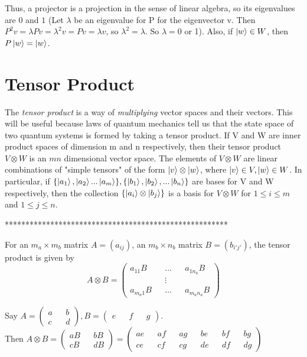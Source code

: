 {Thus, a projector is a projection in the sense of linear algebra, so its eigenvalues are $0$ and $1$ (Let $\lambda$ be an eigenvalue for P for the eigenvector v. Then $P^2 v = \lambda Pv=\lambda^2 v = Pv =\lambda v$, so $\lambda^2=\lambda$. So $\lambda=0$ or 1).  Also, if $\ket{w} \in W$, then $P\ket{w}=\ket{w}$.



\section{Tensor Product}

The \textit{tensor product} is a way of {\emph{multiplying}} vector spaces and their vectors. This will be useful because laws of quantum mechanics tell us that the state space of two quantum systems is formed by taking a tensor product. If V and W are inner product spaces of dimension m and n respectively, then their tensor product $V \otimes W$ is an $mn$ dimensional vector space. The elements of $V \otimes W$ are linear combinations of "simple tensors" of the form $\ket{v} \otimes \ket{w}$, where $\ket{v} \in V, \ket{w} \in W$. In particular, if $\{\ket{a_1}, \ket{a_2}...\ket{a_m}\}, \{\ket{b_1},\ket{b_2}, ...\ket{b_n}\}$ are bases for V and W respectively, then the collection $\{\ket{a_i}\otimes\ket{b_j}\}$ is a basis for $V \otimes W$ for $1\leq i \leq m$ and $1 \leq j \leq n$.

******************************************************
\begin{definition} 
For an $m_a \times m_b$ matrix $A=(a_{ij})$, an $m_b \times n_b$ matrix $B=(b_{i'j'})$, the tensor product is given by
\begin{equation}
A \otimes B=\begin{pmatrix}
a_{11}B && \hdots && a_{1n_a}B\\
&& \vdots && \\ 
a_{m_a1}B && \hdots && a_{m_a n_a}B
\end{pmatrix}    
\end{equation}
\end{definition}

\begin{example}
Say $A=\begin{pmatrix}
a && b\\
c && d
\end{pmatrix},
B=\begin{pmatrix}
e && f && g
\end{pmatrix}$.\\
Then $A \otimes B
=\begin{pmatrix}
aB && bB\\
cB && dB
\end{pmatrix}
=\begin{pmatrix} 
ae && af && ag && be && bf && bg\\
ce && cf && cg && de && df && dg
\end{pmatrix}$
\end{example}

}

